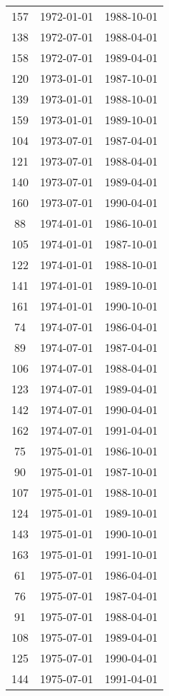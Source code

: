 % 
\begin{tabular}{ccc}
  \hline
  \hline
157 & 1972-01-01 & 1988-10-01 \\ 
  138 & 1972-07-01 & 1988-04-01 \\ 
  158 & 1972-07-01 & 1989-04-01 \\ 
  120 & 1973-01-01 & 1987-10-01 \\ 
  139 & 1973-01-01 & 1988-10-01 \\ 
  159 & 1973-01-01 & 1989-10-01 \\ 
  104 & 1973-07-01 & 1987-04-01 \\ 
  121 & 1973-07-01 & 1988-04-01 \\ 
  140 & 1973-07-01 & 1989-04-01 \\ 
  160 & 1973-07-01 & 1990-04-01 \\ 
  88 & 1974-01-01 & 1986-10-01 \\ 
  105 & 1974-01-01 & 1987-10-01 \\ 
  122 & 1974-01-01 & 1988-10-01 \\ 
  141 & 1974-01-01 & 1989-10-01 \\ 
  161 & 1974-01-01 & 1990-10-01 \\ 
  74 & 1974-07-01 & 1986-04-01 \\ 
  89 & 1974-07-01 & 1987-04-01 \\ 
  106 & 1974-07-01 & 1988-04-01 \\ 
  123 & 1974-07-01 & 1989-04-01 \\ 
  142 & 1974-07-01 & 1990-04-01 \\ 
  162 & 1974-07-01 & 1991-04-01 \\ 
  75 & 1975-01-01 & 1986-10-01 \\ 
  90 & 1975-01-01 & 1987-10-01 \\ 
  107 & 1975-01-01 & 1988-10-01 \\ 
  124 & 1975-01-01 & 1989-10-01 \\ 
  143 & 1975-01-01 & 1990-10-01 \\ 
  163 & 1975-01-01 & 1991-10-01 \\ 
  61 & 1975-07-01 & 1986-04-01 \\ 
  76 & 1975-07-01 & 1987-04-01 \\ 
  91 & 1975-07-01 & 1988-04-01 \\ 
  108 & 1975-07-01 & 1989-04-01 \\ 
  125 & 1975-07-01 & 1990-04-01 \\ 
  144 & 1975-07-01 & 1991-04-01 \\ 

\end{tabular}
